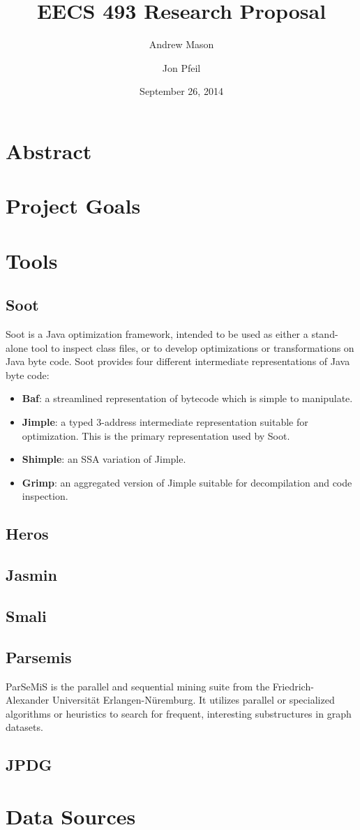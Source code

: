 \documentclass[12pt]{article}
\title{EECS 493 Research Proposal}
\author{Andrew Mason \and Jon Pfeil}
\date{September 26, 2014}
\begin{document}
\maketitle
\tableofcontents
\pagebreak
\section{Abstract}
\section{Project Goals}
\section{Tools}
\subsection{Soot}
Soot is a Java optimization framework, intended to be used as either a stand-alone tool to inspect class files, or to develop optimizations or transformations on Java byte code. Soot provides four different intermediate representations of Java byte code:
\begin{itemize}
    \item\textbf{Baf}: a streamlined representation of bytecode which is simple to manipulate.
    \item\textbf{Jimple}: a typed 3-address intermediate representation suitable for optimization. This is the primary representation used by Soot.
    \item\textbf{Shimple}: an SSA variation of Jimple.
    \item\textbf{Grimp}: an aggregated version of Jimple suitable for decompilation and code inspection.
\end{itemize}
\subsection{Heros}
\subsection{Jasmin}%
\subsection{Smali}%
\subsection{Parsemis}
ParSeMiS is the parallel and sequential mining suite from the Friedrich-Alexander Universit{\"a}t Erlangen-N{\"u}remburg. It utilizes parallel or specialized algorithms or heuristics to search for frequent, interesting substructures in graph datasets.
\subsection{JPDG}
\section{Data Sources}
\end{document}
